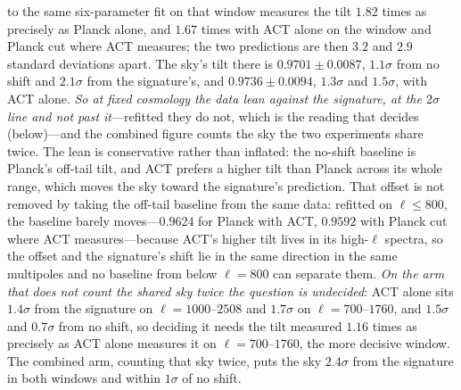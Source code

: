 \documentclass[11pt,a4paper]{article}
\theoremstyle{plain}
\theoremstyle{definition}
\theoremstyle{remark}
\begin{document}
to the same six-parameter fit on that window measures the tilt $1.82$ times as precisely as Planck alone, and
$1.67$ times with ACT alone on the window and Planck cut where ACT measures; the two predictions are then
$3.2$ and $2.9$ standard deviations apart. The sky's tilt there is $0.9701\pm0.0087$, $1.1\sigma$ from no
shift and $2.1\sigma$ from the signature's, and $0.9736\pm0.0094$, $1.3\sigma$ and $1.5\sigma$, with ACT
alone. \emph{So at fixed cosmology the data lean against the signature, at the $2\sigma$ line and not past it}---refitted they do not, which is the reading that decides (below)---and the combined
figure counts the sky the two experiments share twice. The lean is conservative rather than inflated: the
no-shift baseline is Planck's off-tail tilt, and ACT prefers a higher tilt than Planck across its whole range,
which moves the sky toward the signature's prediction. That offset is not removed by
taking the off-tail baseline from the same data: refitted on $\ell\le800$, the baseline barely moves---$0.9624$
for Planck with ACT, $0.9592$ with Planck cut where ACT measures---because ACT's higher tilt lives in its high-$\ell$
spectra, so the offset and the signature's shift lie in the same direction in the same multipoles and no baseline from
below $\ell=800$ can separate them. \emph{On the arm that does not count the shared sky twice the question is
undecided}: ACT alone sits $1.4\sigma$ from the signature on $\ell=1000$--$2508$ and $1.7\sigma$ on $\ell=700$--$1760$,
and $1.5\sigma$ and $0.7\sigma$ from no shift, so deciding it needs the tilt measured $1.16$ times as precisely as ACT
alone measures it on $\ell=700$--$1760$, the more decisive window. The combined arm, counting that sky twice, puts
the sky $2.4\sigma$ from the signature in both windows and within $1\sigma$ of no shift.
\end{document}
